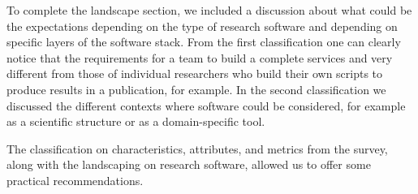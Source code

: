 To complete the landscape section, we included a discussion about what could be the expectations depending on the type of research software and depending on specific layers of the software stack. From the first classification one can clearly notice that the requirements for a team to build a complete services and very different from those of individual researchers who build their own scripts to produce results in a publication, for example. In the second classification we discussed the different contexts where software could be considered, for example as a scientific structure or as a domain-specific tool.

The classification on characteristics, attributes, and metrics from the survey, along with the landscaping on research software, allowed us to offer some practical recommendations.
